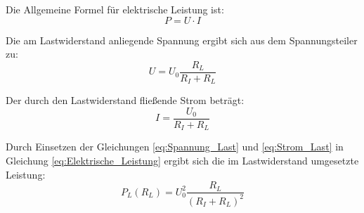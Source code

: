 Die Allgemeine Formel für elektrische Leistung ist:
\begin{equation}
\label{eq:Elektrische_Leistung}
    P = U \cdot I
\end{equation}

\noindent Die am Lastwiderstand anliegende Spannung ergibt sich aus dem Spannungsteiler zu:
\begin{equation}
\label{eq:Spannung_Last}
U = U_0 \frac{R_L}{R_I + R_L}
\end{equation}

\noindent Der durch den Lastwiderstand fließende Strom beträgt:
\begin{equation}
\label{eq:Strom_Last}
I = \frac{U_0}{R_I + R_L}
\end{equation}

\noindent Durch Einsetzen der Gleichungen \ref{eq:Spannung_Last} und \ref{eq:Strom_Last} in Gleichung \ref{eq:Elektrische_Leistung} ergibt sich die im Lastwiderstand umgesetzte Leistung:
\begin{equation}
\label{eq:Leistung_Last_Spannungsquelle}
P_L(R_L) = U_0^2 \frac{R_L}{(R_I + R_L)^2}
\end{equation}